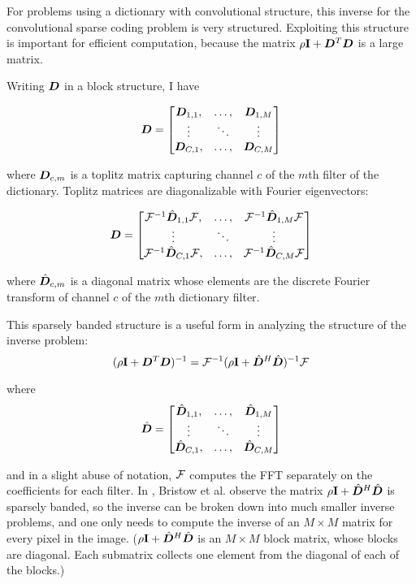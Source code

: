 For problems using a dictionary with convolutional structure, this inverse for the convolutional sparse coding problem is very structured. Exploiting this structure is important for efficient computation, because the matrix $\rho{\bf I} + \bm{D}^T\bm{D}$ is a large matrix.

Writing $\bm{D}$ in a block structure, I have

\begin{equation}
\bm{D} = \begin{bmatrix}
\bm{D}_{1,1}, & \hdots, & \bm{D}_{1,M}\\
\vdots & \ddots & \vdots\\
\bm{D}_{C,1}, & \hdots, & \bm{D}_{C,M}
\end{bmatrix}
\end{equation}

where $\bm{D}_{c,m}$ is a toplitz matrix capturing channel $c$ of the $m$th filter of the dictionary. Toplitz matrices are diagonalizable with Fourier eigenvectors:

\begin{equation}
\bm{D} = \begin{bmatrix}
\mathcal{F}^{-1}\hat{\bm{D}}_{1,1}\mathcal{F}, & \hdots, & \mathcal{F}^{-1}\hat{\bm{D}}_{1,M}\mathcal{F}\\
\vdots & \ddots & \vdots\\
\mathcal{F}^{-1}\hat{\bm{D}}_{C,1}\mathcal{F}, & \hdots, & \mathcal{F}^{-1}\hat{\bm{D}}_{C,M}\mathcal{F}
\end{bmatrix}
\end{equation}

where $\hat{\bm{D}}_{c,m}$ is a diagonal matrix whose elements are the discrete Fourier transform of channel $c$ of the $m$th dictionary filter.

This sparsely banded structure is a useful form in analyzing the structure of the inverse problem:
\begin{equation}
(\rho {\bf I} + \bm{D}^T\bm{D})^{-1} = \mathcal{F}^{-1}(\rho{\bf I} + \hat{\bm{D}}^H\hat{\bm{D}})^{-1}\mathcal{F}
\end{equation}

where
\begin{equation}
\hat{\bm{D}} = \begin{bmatrix}
\hat{\bm{D}}_{1,1}, & \hdots, & \hat{\bm{D}}_{1,M}\\
\vdots & \ddots & \vdots\\
\hat{\bm{D}}_{C,1}, & \hdots, & \hat{\bm{D}}_{C,M}
\end{bmatrix}
\end{equation}

and in a slight abuse of notation, $\mathcal{F}$ computes the FFT separately on the coefficients for each filter.  In \cite{Bristow2013fast}, Bristow et al. observe the matrix $\rho{\bf I} + \hat{\bm{D}}^H\hat{\bm{D}}$ is sparsely banded, so the inverse can be broken down into much smaller inverse problems, and one only needs to compute the inverse of an $M \times M$ matrix for every pixel in the image. ($\rho{\bf I} + \hat{\bm{D}}^H\hat{\bm{D}}$ is an $M \times M$ block matrix, whose blocks are diagonal.  Each submatrix collects one element from the diagonal of each of the blocks.)

